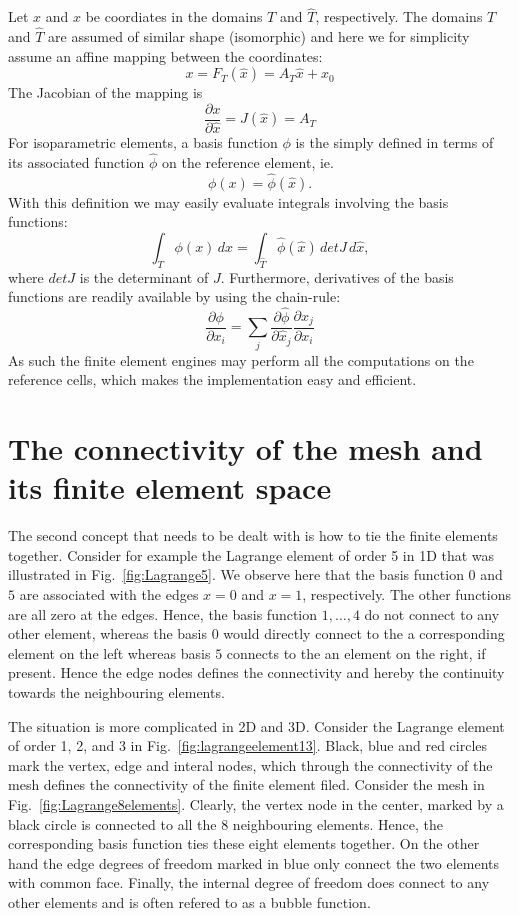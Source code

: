 Let $x$ and $\hat{x}$ be coordiates in the domains $T$ and $\hat{T}$, respectively. 
The domains $T$ and $\hat{T}$ are assumed of similar shape (isomorphic) 
and here we  
for simplicity assume an affine mapping between the coordinates:  
\[
x = F_T(\hat{x}) = A_T \hat{x} + x_0   
\]
The Jacobian of the mapping is 
\[
\frac{\partial x}{\partial \hat{x}} = J(\hat{x}) = A_T      
\]
For isoparametric elements, a basis function $\phi$
is the simply defined in terms of its associated function $\hat{\phi}$
on the reference
element, ie. 
\[
\phi(x) = \hat{\phi}(\hat{x}) .  
\]
With this definition we may easily evaluate integrals involving the basis functions: 
\[
\int_T \phi(x) \, dx = \int_{\hat{T}} \hat{\phi}(\hat{x}) \, det J \, d\hat{x},  
\]
where $det J$ is the determinant of $J$.  Furthermore, derivatives of the basis functions are readily available by using the chain-rule:  
\[
\frac{\partial \phi}{\partial x_i } = \sum_j  \frac{\partial \hat{\phi}}{\partial \hat{x}_j } \frac{\partial \hat{x}_j}{\partial x_i } 
\]
As such the finite element engines may perform all the computations on the reference cells, which makes the implementation easy and efficient. 

\section{The connectivity of the mesh and its finite element space}

The second concept that needs to be dealt with is how to tie the finite elements together. 
Consider for example the Lagrange element of order 5 in 1D that was illustrated in Fig.~\ref{fig:Lagrange5}. We observe here that the basis function $0$ and $5$ are associated
with the edges $x=0$ and $x=1$, respectively. The other functions are all zero at the edges. Hence, the basis function $1, \ldots, 4$ do not connect 
to any other element, whereas the basis $0$ would directly connect to the a corresponding element on the left whereas basis $5$ connects to the 
an element on the right, if present. Hence the edge nodes defines the connectivity and hereby the continuity towards the neighbouring elements. 

The situation is more complicated in 2D and 3D. Consider the Lagrange element of order 1, 2, and 3 in Fig.~\ref{fig:lagrangeelement13}. Black, blue and red circles mark
the vertex, edge and interal nodes, which through the connectivity of the mesh defines the connectivity of the finite element filed. 
Consider the mesh in Fig.~\ref{fig:Lagrange8elements}. Clearly, the vertex node in the center, marked by a black circle is connected to all the 8 neighbouring elements. 
Hence, the corresponding basis function ties these eight elements together. On the other hand the edge degrees of freedom marked in 
blue only connect the two elements with common face. Finally, the internal degree of freedom does connect to any other elements and is often refered to as a bubble
function. 


